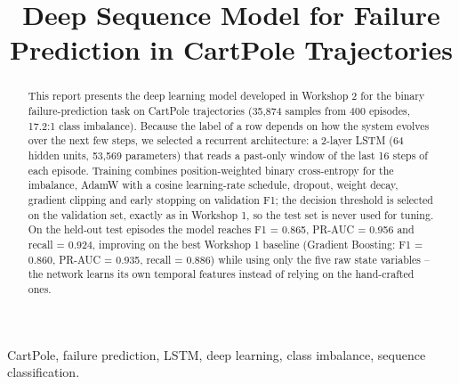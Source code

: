 \documentclass[conference]{IEEEtran}
\begin{document}
\title{Deep Sequence Model for Failure Prediction in CartPole Trajectories}

\author{
\and
{}
\and
{}
}

\maketitle

\begin{abstract}
This report presents the deep learning model developed in Workshop 2 for the
binary failure-prediction task on CartPole trajectories (35,874 samples from
400 episodes, 17.2:1 class imbalance). Because the label of a row depends on
how the system evolves over the next few steps, we selected a recurrent
architecture: a 2-layer LSTM (64 hidden units, 53{,}569 parameters) that reads
a past-only window of the last 16 steps of each episode. Training combines
position-weighted binary cross-entropy for the imbalance, AdamW with a cosine
learning-rate schedule, dropout, weight decay, gradient clipping and early
stopping on validation F1; the decision threshold is selected on the
validation set, exactly as in Workshop 1, so the test set is never used for
tuning. On the held-out test episodes the model reaches F1 = 0.865,
PR-AUC = 0.956 and recall = 0.924, improving on the best Workshop 1 baseline
(Gradient Boosting: F1 = 0.860, PR-AUC = 0.935, recall = 0.886) while using
only the five raw state variables -- the network learns its own temporal
features instead of relying on the hand-crafted ones.
\end{abstract}

\begin{IEEEkeywords}
CartPole, failure prediction, LSTM, deep learning, class imbalance, sequence classification.
\end{IEEEkeywords}
\end{document}
